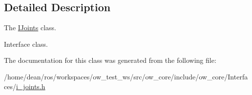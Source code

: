 \subsection{Detailed Description}
The \hyperlink{classow__core_1_1IJoints}{I\+Joints} class. 

Interface class. 

The documentation for this class was generated from the following file\+:\begin{DoxyCompactItemize}
\item 
/home/dean/ros/workspaces/ow\+\_\+test\+\_\+ws/src/ow\+\_\+core/include/ow\+\_\+core/\+Interfaces/\hyperlink{i__joints_8h}{i\+\_\+joints.\+h}\end{DoxyCompactItemize}
